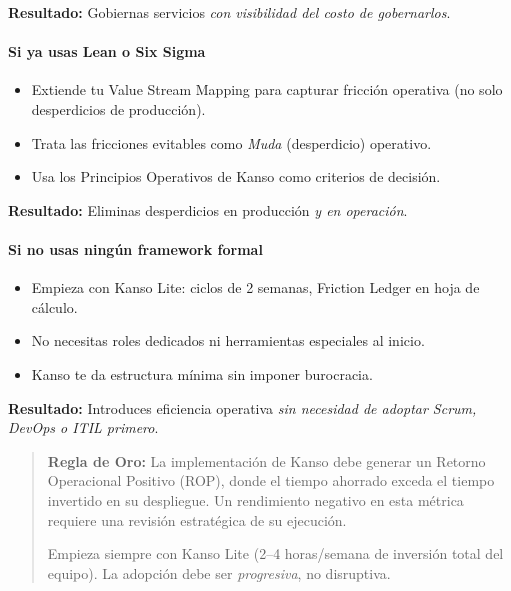 \textbf{Resultado:} Gobiernas servicios \emph{con visibilidad del costo de gobernarlos}.

\paragraph{Si ya usas Lean o Six Sigma}

\begin{itemize}
    \item Extiende tu Value Stream Mapping para capturar fricción operativa (no solo desperdicios de producción).
    \item Trata las fricciones evitables como \textit{Muda} (desperdicio) operativo.
    \item Usa los Principios Operativos de Kanso como criterios de decisión.
\end{itemize}

\textbf{Resultado:} Eliminas desperdicios en producción \emph{y en operación}.

\paragraph{Si no usas ningún framework formal}

\begin{itemize}
    \item Empieza con Kanso Lite: ciclos de 2 semanas, Friction Ledger en hoja de cálculo.
    \item No necesitas roles dedicados ni herramientas especiales al inicio.
    \item Kanso te da estructura mínima sin imponer burocracia.
\end{itemize}

\textbf{Resultado:} Introduces eficiencia operativa \emph{sin necesidad de adoptar Scrum, DevOps o ITIL primero}.

\vspace{1em}

\begin{quote}
\textbf{Regla de Oro:}\label{sec:rop} La implementación de Kanso debe generar un Retorno Operacional Positivo (ROP), 
donde el tiempo ahorrado exceda el tiempo invertido en su despliegue. Un rendimiento negativo en esta métrica requiere una revisión estratégica de su ejecución.

Empieza siempre con Kanso Lite (2--4 horas/semana de inversión total del equipo). 
La adopción debe ser \emph{progresiva}, no disruptiva.
\end{quote}


